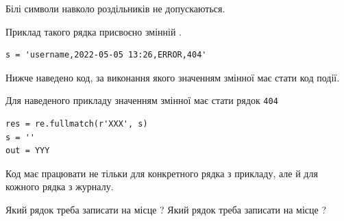 \documentclass[12pt, ukrainian]{article}
\def\code#1{\Verb!#1!}
\begin{document}
{Білі символи навколо роздільників не допускаються.

Приклад такого рядка присвоєно змінній .



\begin{verbatim}
s = 'username,2022-05-05 13:26,ERROR,404'
\end{verbatim}


Нижче наведено код, за виконання якого значенням змінної  має стати код події.

Для наведеного прикладу значенням змінної  має стати рядок \code{404}



\begin{verbatim}
res = re.fullmatch(r'XXX', s)
s = ''
out = YYY
\end{verbatim}


Код має працювати не тільки для конкретного рядка з прикладу, але й для кожного рядка з журналу.


Який рядок треба записати на місце  ?
Який рядок треба записати на місце  ?\par

}
\newpage
\end{document}
